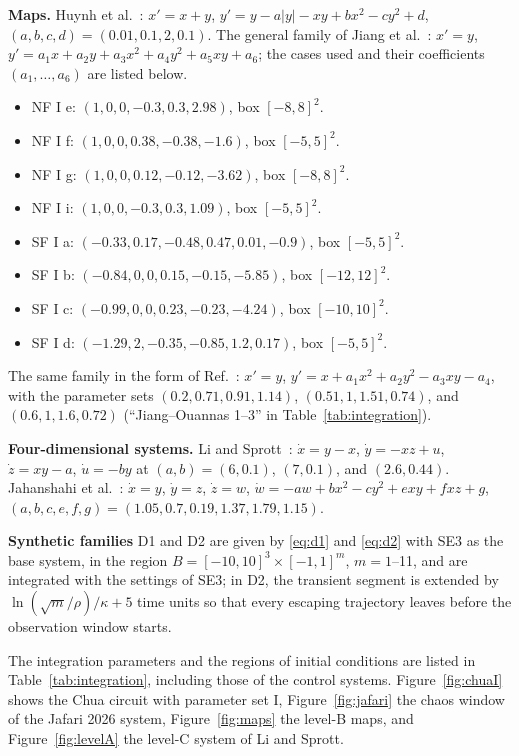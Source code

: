 \textbf{Maps.} Huynh et al.~\cite{Huynh2019}: $x'=x+y$, $y'=y-a|y|-xy+bx^2-cy^2+d$, $(a,b,c,d)=(0.01,0.1,2,0.1)$. The general family of Jiang et al.~\cite{Jiang2016Maps}: $x'=y$, $y'=a_1x+a_2y+a_3x^2+a_4y^2+a_5xy+a_6$; the cases used and their coefficients $(a_1,\dots,a_6)$ are listed below.
\begin{itemize}
\item NF I e: $(1,0,0,-0.3,0.3,2.98)$, box $[-8,8]^2$.
\item NF I f: $(1,0,0,0.38,-0.38,-1.6)$, box $[-5,5]^2$.
\item NF I g: $(1,0,0,0.12,-0.12,-3.62)$, box $[-8,8]^2$.
\item NF I i: $(1,0,0,-0.3,0.3,1.09)$, box $[-5,5]^2$.
\item SF I a: $(-0.33,0.17,-0.48,0.47,0.01,-0.9)$, box $[-5,5]^2$.
\item SF I b: $(-0.84,0,0,0.15,-0.15,-5.85)$, box $[-12,12]^2$.
\item SF I c: $(-0.99,0,0,0.23,-0.23,-4.24)$, box $[-10,10]^2$.
\item SF I d: $(-1.29,2,-0.35,-0.85,1.2,0.17)$, box $[-5,5]^2$.
\end{itemize}
The same family in the form of Ref.~\cite{Ouannas2018}: $x'=y$, $y'=x+a_1x^2+a_2y^2-a_3xy-a_4$, with the parameter sets $(0.2,0.71,0.91,1.14)$, $(0.51,1,1.51,0.74)$, and $(0.6,1,1.6,0.72)$ (``Jiang--Ouannas 1--3'' in Table~\ref{tab:integration}).

\textbf{Four-dimensional systems.} Li and Sprott~\cite{LiSprott2014}: $\dot x=y-x$, $\dot y=-xz+u$, $\dot z=xy-a$, $\dot u=-by$ at $(a,b)=(6,0.1)$, $(7,0.1)$, and $(2.6,0.44)$. Jahanshahi et al.~\cite{Jahanshahi2019}: $\dot x=y$, $\dot y=z$, $\dot z=w$, $\dot w=-aw+bx^2-cy^2+exy+fxz+g$, $(a,b,c,e,f,g)=(1.05,0.7,0.19,1.37,1.79,1.15)$.

\textbf{Synthetic families} D1 and D2 are given by \eqref{eq:d1} and \eqref{eq:d2} with SE3 as the base system, in the region $B=[-10,10]^3\times[-1,1]^m$, $m=1$--11, and are integrated with the settings of SE3; in D2, the transient segment is extended by $\ln(\sqrt m/\rho)/\kappa+5$ time units so that every escaping trajectory leaves before the observation window starts.

The integration parameters and the regions of initial conditions are listed in Table~\ref{tab:integration}, including those of the control systems. Figure~\ref{fig:chuaI} shows the Chua circuit with parameter set I, Figure~\ref{fig:jafari} the chaos window of the Jafari 2026 system, Figure~\ref{fig:maps} the level-B maps, and Figure~\ref{fig:levelA} the level-C system of Li and Sprott.

